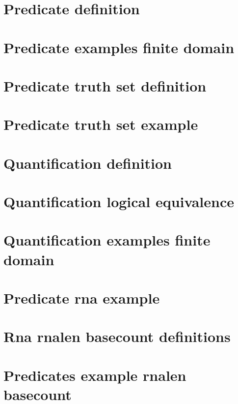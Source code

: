 \section*{Predicate definition}

\vfill
\section*{Predicate examples finite domain}

\vfill
\section*{Predicate truth set definition}

\vfill
\section*{Predicate truth set example}

\vfill
\section*{Quantification definition}

\vfill
\section*{Quantification logical equivalence}

\vfill
\section*{Quantification examples finite domain}

\vfill
\section*{Predicate rna example}

\vfill
\section*{Rna rnalen basecount definitions}

\vfill
\section*{Predicates example rnalen basecount}

\vfill
